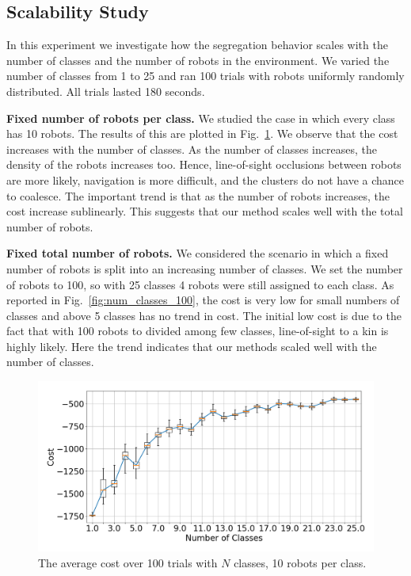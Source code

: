 \documentclass[letterpaper, 10 pt, conference]{ieeeconf}
\newcommand{\myparagraph}[1]{\textbf{#1.}}
\begin{document}
\subsection{Scalability Study} \label{section:scalability}

In this experiment we investigate how the segregation behavior scales with the
number of classes and the number of robots in the environment. We varied the
number of classes from 1 to 25 and ran 100 trials with robots uniformly randomly
distributed. All trials lasted 180 seconds.

\myparagraph{Fixed number of robots per class}
We studied the case in which every class has 10 robots. The results of this are
plotted in Fig.~\ref{fig:num_classes_10}. We observe that the cost increases
with the number of classes. As the number of classes increases,
the density of the robots increases too. Hence, line-of-sight occlusions between robots are more likely,
navigation is more difficult, and the clusters do not have a chance to coalesce.
The important trend is that as the number of robots increases, the cost increase sublinearly.
This suggests that our method scales well with the total number of robots.

\myparagraph{Fixed total number of robots}
We considered the scenario in which a fixed number of robots is split into an
increasing number of classes. We set the number of robots to 100, so with 25
classes 4 robots were still assigned to each class. As reported in
Fig.~\ref{fig:num_classes_100}, the cost is very low for small numbers of classes
and above 5 classes has no trend in cost. The initial low cost is due to the fact that
with 100 robots to divided among few classes, line-of-sight to a kin is highly likely.
Here the trend indicates that our methods scaled well with the number of classes.

\begin{figure}[t]
  \centering
  \includegraphics[width=1\linewidth]{./images/num_classes_vs_cost_10_per_class}
  \caption{The average cost over 100 trials with $N$ classes, 10 robots per class.}
  \label{fig:num_classes_10}
\end{figure}
\end{document}
